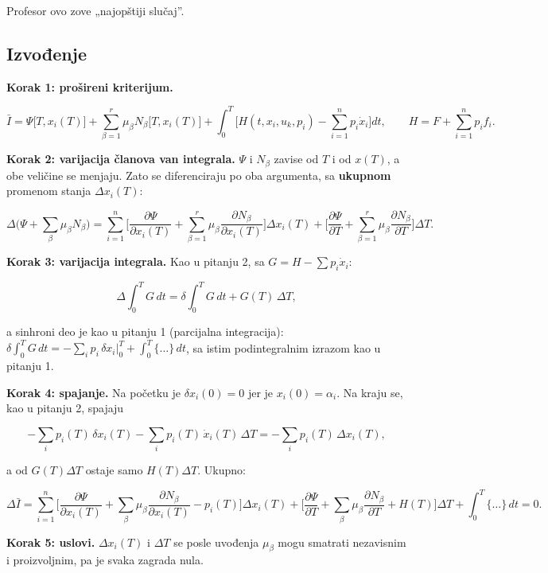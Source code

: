 \documentclass[11pt,a4paper,parskip=half,headsepline,numbers=noenddot]{scrartcl}
\begin{document}
Profesor ovo zove „najopštiji slučaj''.

\subsection{Izvođenje}

\textbf{Korak 1: prošireni kriterijum.}

\[\bar I = \Psi\big[T, x_i(T)\big] + \sum_{\beta=1}^r\mu_\beta N_\beta\big[T, x_i(T)\big] + \int_0^T\Big[H(t, x_i, u_k, p_i) - \sum_{i=1}^n p_i\dot x_i\Big]dt, \qquad H = F + \sum_{i=1}^n p_i f_i .\]

\textbf{Korak 2: varijacija članova van integrala.} \(\Psi\) i \(N_\beta\) zavise od \(T\) i od \(x(T)\), a obe veličine se menjaju. Zato se diferenciraju po oba argumenta, sa \textbf{ukupnom} promenom stanja \(\Delta x_i(T)\):

\[\Delta\Big(\Psi + \sum_\beta\mu_\beta N_\beta\Big) = \sum_{i=1}^n\Big[\frac{\partial\Psi}{\partial x_i(T)} + \sum_{\beta=1}^r\mu_\beta\frac{\partial N_\beta}{\partial x_i(T)}\Big]\Delta x_i(T) + \Big[\frac{\partial\Psi}{\partial T} + \sum_{\beta=1}^r\mu_\beta\frac{\partial N_\beta}{\partial T}\Big]\Delta T .\]

\textbf{Korak 3: varijacija integrala.} Kao u pitanju 2, sa \(G = H - \sum p_i\dot x_i\):

\[\Delta\int_0^T G\,dt = \delta\int_0^T G\,dt + G(T)\,\Delta T,\]

a sinhroni deo je kao u pitanju 1 (parcijalna integracija): \(\delta\int_0^T G\,dt = -\sum_i p_i\,\delta x_i\big|_0^T + \int_0^T\{\dots\}\,dt\), sa istim podintegralnim izrazom kao u pitanju 1.

\textbf{Korak 4: spajanje.} Na početku je \(\delta x_i(0) = 0\) jer je \(x_i(0) = \alpha_i\). Na kraju se, kao u pitanju 2, spajaju

\[-\sum_i p_i(T)\,\delta x_i(T) - \sum_i p_i(T)\,\dot x_i(T)\,\Delta T = -\sum_i p_i(T)\,\Delta x_i(T),\]

a od \(G(T)\Delta T\) ostaje samo \(H(T)\Delta T\). Ukupno:

\[\Delta\bar I = \sum_{i=1}^n\Big[\frac{\partial\Psi}{\partial x_i(T)} + \sum_{\beta}\mu_\beta\frac{\partial N_\beta}{\partial x_i(T)} - p_i(T)\Big]\Delta x_i(T) + \Big[\frac{\partial\Psi}{\partial T} + \sum_{\beta}\mu_\beta\frac{\partial N_\beta}{\partial T} + H(T)\Big]\Delta T + \int_0^T\{\dots\}\,dt = 0 .\]

\textbf{Korak 5: uslovi.} \(\Delta x_i(T)\) i \(\Delta T\) se posle uvođenja \(\mu_\beta\) mogu smatrati nezavisnim i proizvoljnim, pa je svaka zagrada nula.
\end{document}
